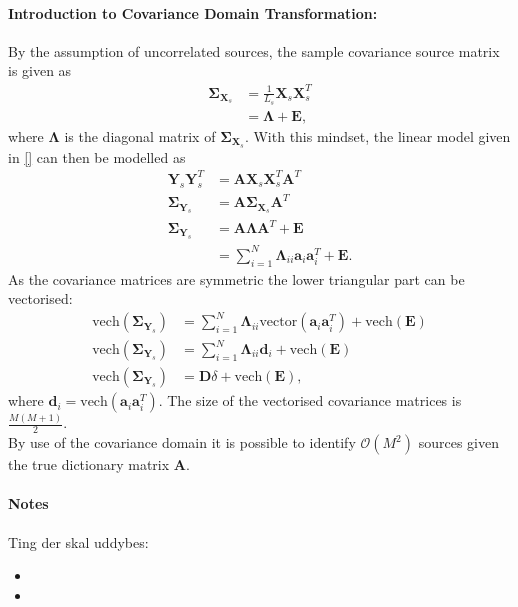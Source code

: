 \paragraph{Introduction to Covariance Domain Transformation:}
By the assumption of uncorrelated sources, the sample covariance source matrix is given as
\begin{align*}
\boldsymbol{\Sigma}_{\mathbf{X}_s} &= \frac{1}{L_s} \mathbf{X}_s \mathbf{X}_s^T \\
&= \boldsymbol{\Lambda} + \mathbf{E},
\end{align*}
where $\boldsymbol{\Lambda}$ is the diagonal matrix of $\boldsymbol{\Sigma}_{\mathbf{X}_s}$. With this mindset, the linear model given in \eqref{} can then be modelled as
\begin{align*}
\mathbf{Y}_s \mathbf{Y}_s^T &= \mathbf{AX}_s \mathbf{X}_s^T \mathbf{A}^T \\
\boldsymbol{\Sigma}_{\mathbf{Y}_s} &= \mathbf{A} \boldsymbol{\Sigma}_{\mathbf{X}_s} \mathbf{A}^T \\
\boldsymbol{\Sigma}_{\mathbf{Y}_s} &= \mathbf{A} \boldsymbol{\Lambda} \mathbf{A}^T + \mathbf{E} \\
&= \sum_{i=1}^N \boldsymbol{\Lambda}_{ii} \mathbf{a}_i \mathbf{a}_i^T + \mathbf{E}.
\end{align*}
As the covariance matrices are symmetric the lower triangular part can be vectorised:
\begin{align*}
\text{vech}(\boldsymbol{\Sigma}_{\mathbf{Y}_s}) &= \sum_{i=1}^N \boldsymbol{\Lambda}_{ii} \text{vector}(\mathbf{a}_i \mathbf{a}_i^T) + \text{vech}(\mathbf{E}) \\
\text{vech}(\boldsymbol{\Sigma}_{\mathbf{Y}_s}) &= \sum_{i=1}^N \boldsymbol{\Lambda}_{ii} \mathbf{d}_i + \text{vech}(\mathbf{E}) \\
\text{vech}(\boldsymbol{\Sigma}_{\mathbf{Y}_s}) &= \mathbf{D} \delta + \text{vech}(\mathbf{E}),
\end{align*}
where $\mathbf{d}_i = \text{vech}(\mathbf{a}_i \mathbf{a}_i^T)$. The size of the vectorised covariance matrices is $\frac{M(M+1)}{2}$.
\\
By use of the covariance domain it is possible to identify $\mathcal{O}(M^2)$ sources given the true dictionary matrix $\mathbf{A}$.


\paragraph{Notes}
Ting der skal uddybes:
\begin{itemize}
\item 
\item
\end{itemize}

